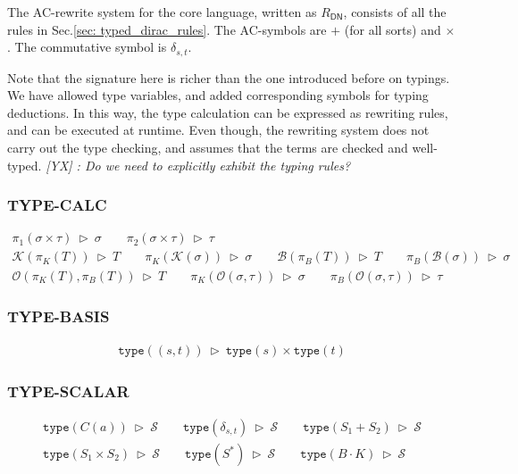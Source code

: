 \documentclass[manuscript, review, timestamp]{acmart}
\newcommand{\yx}[1]{\textit{\color{blue}[YX] : #1}}
\newcommand*{\Sc}{\mathcal{S}}
\newcommand*{\K}{\mathcal{K}}
\newcommand*{\B}{\mathcal{B}}
\newcommand*{\Op}{\mathcal{O}}
\newcommand*{\type}{\texttt{type}}
\newcommand*{\reduce}{\ \triangleright\ }
\begin{document}
\begin{definition} 
  The AC-rewrite system for the core language, written as $R_\textsf{DN}$, consists of all the rules in Sec.\ref{sec: typed_dirac_rules}.
  The AC-symbols are $+$ (for all sorts) and $\times$. The commutative symbol is $\delta_{s, t}$.
\end{definition}

Note that the signature here is richer than the one introduced before on typings. We have allowed type variables, and added corresponding symbols for typing deductions. In this way, the type calculation can be expressed as rewriting rules, and can be executed at runtime. Even though, the rewriting system does not carry out the type checking, and assumes that the terms are checked and well-typed.
\yx{Do we need to explicitly exhibit the typing rules?}

\subsubsection*{\textsf{TYPE-CALC}}
\begin{gather*}
  \pi_1(\sigma \times \tau) \reduce \sigma 
  \qquad
  \pi_2(\sigma \times \tau) \reduce \tau 
  \\
  \K(\pi_K(T)) \reduce T
  \qquad 
  \pi_K(\K(\sigma)) \reduce \sigma
  \qquad
  \B(\pi_B(T)) \reduce T
  \qquad 
  \pi_B(\B(\sigma)) \reduce \sigma
  \\
  \Op(\pi_K(T), \pi_B(T)) \reduce T
  \qquad
  \pi_K(\Op(\sigma, \tau)) \reduce \sigma
  \qquad
  \pi_B(\Op(\sigma, \tau)) \reduce \tau
\end{gather*}

\subsubsection*{\textsf{TYPE-BASIS}}
\begin{gather*}
  \type((s, t)) \reduce \type(s) \times \type(t)
\end{gather*}

\subsubsection*{\textsf{TYPE-SCALAR}}
\begin{gather*}
  \type(C(a)) \reduce \Sc
  \qquad
  \type(\delta_{s, t}) \reduce \Sc
  \qquad
  \type(S_1 + S_2) \reduce \Sc
  \\
  \type(S_1 \times S_2) \reduce \Sc
  \qquad
  \type(S^*) \reduce \Sc
  \qquad
  \type(B \cdot K) \reduce \Sc
\end{gather*}
\end{document}
